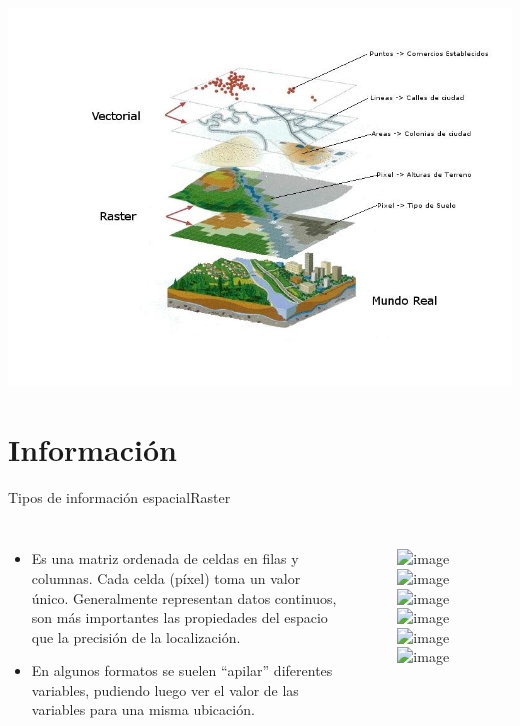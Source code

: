 \documentclass{beamer}
\begin{document}
\begin{frame}[plain]{}
	\includegraphics[width=\textwidth]{IMGs/GIS}
\end{frame}

\section{Información}

\begin{frame}{Tipos de información espacial}{Raster}
	\begin{columns}
			\begin{itemize}
				\item Es una matriz ordenada de celdas en filas y columnas. Cada celda (píxel) toma un valor único. Generalmente representan datos continuos, son más importantes las propiedades del espacio que la precisión de la localización.
				\item<6> En algunos formatos se suelen “apilar” diferentes variables, pudiendo luego ver el valor de las variables para una misma ubicación.
			\end{itemize}
		    \begin{figure}
		    	\includegraphics<1>[width=0.8\textwidth]{IMGs/raster1}
		    	\includegraphics<2>[width=0.8\textwidth]{IMGs/raster2}
		    	\includegraphics<3>[width=0.8\textwidth]{IMGs/raster3}
		    	\includegraphics<4>[width=0.8\textwidth]{IMGs/raster4}
		    	\includegraphics<5>[width=0.8\textwidth]{IMGs/raster5}
		    	\includegraphics<6>[width=0.9\textwidth]{IMGs/multi}
		    \end{figure} 
	\end{columns}
\end{frame}
\end{document}
